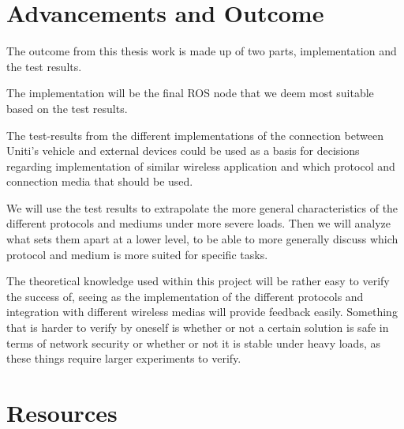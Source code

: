 \documentclass[a4paper]{article}
\begin{document}


\section{Advancements and Outcome}




The outcome from this thesis work is made up of two parts, implementation and
the test results.

The implementation will be the final ROS node that we deem most suitable based
on the test results.

The test-results from the different implementations of the connection between
Uniti's vehicle and external devices could be used as a basis for decisions
regarding implementation of similar wireless application and which protocol
and connection media that should be used.

We will use the test results to extrapolate the more general characteristics of
the different protocols and mediums under more severe loads. Then we will
analyze what sets them apart at a lower level, to be able to more generally
discuss which protocol and medium is more suited for specific tasks.


The theoretical knowledge used within this project will be rather easy
to verify the success of, seeing as the implementation of the different 
protocols and integration with different wireless medias will provide
feedback easily. Something that is harder to verify by oneself is whether
or not a certain solution is safe in terms of network security or whether
or not it is stable under heavy loads, as these things require larger
experiments to verify.

\section{Resources}
\end{document}

